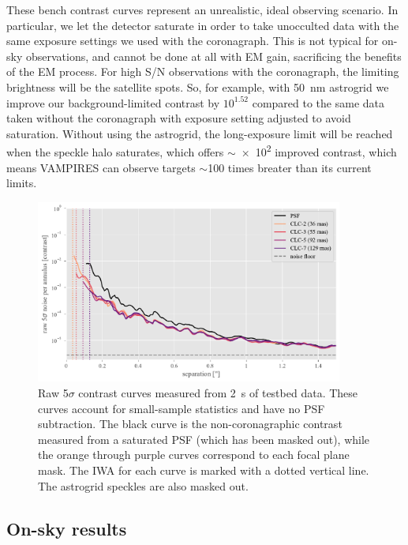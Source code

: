 \documentclass[]{spie}  %
\begin{document}
These bench contrast curves represent an unrealistic, ideal observing scenario. In particular, we let the detector saturate in order to take unocculted data with the same exposure settings we used with the coronagraph. This is not typical for on-sky observations, and cannot be done at all with EM gain, sacrificing the benefits of the EM process. For high S/N observations with the coronagraph, the limiting brightness will be the satellite spots. So, for example, with \qty{50}{\nano\meter} astrogrid we improve our background-limited contrast by $10^{1.52}$ compared to the same data taken without the coronagraph with exposure setting adjusted to avoid saturation. Without using the astrogrid, the long-exposure limit will be reached when the speckle halo saturates, which offers $\sim$\num{e2} improved contrast, which means VAMPIRES can observe targets $\sim$100 times breater than its current limits.

\begin{figure}
   \centering
   \includegraphics[width=0.9\textwidth]{figures/saturated_bench_20220628_curves}
   \caption{Raw 5$\sigma$ contrast curves measured from \qty{2}{\second} of testbed data. These curves account for small-sample statistics and have no PSF subtraction. The black curve is the non-coronagraphic contrast measured from a saturated PSF (which has been masked out), while the orange through purple curves correspond to each focal plane mask. The IWA for each curve is marked with a dotted vertical line. The astrogrid speckles are also masked out.}\label{fig:contrast}
\end{figure}

\subsection{On-sky results}\label{sec:onsky}
\end{document}
